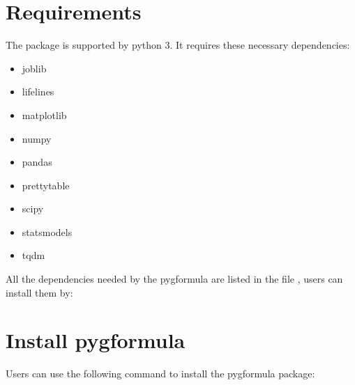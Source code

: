 \documentclass[letterpaper,10pt,english]{sphinxmanual}
\begin{document}
\section{Requirements}
\label{\detokenize{Installation:requirements}}
\sphinxAtStartPar
The package is supported by python 3. It requires these necessary dependencies:
\begin{itemize}
\item {} 
\sphinxAtStartPar
joblib

\item {} 
\sphinxAtStartPar
lifelines

\item {} 
\sphinxAtStartPar
matplotlib

\item {} 
\sphinxAtStartPar
numpy

\item {} 
\sphinxAtStartPar
pandas

\item {} 
\sphinxAtStartPar
prettytable

\item {} 
\sphinxAtStartPar
scipy

\item {} 
\sphinxAtStartPar
statsmodels

\item {} 
\sphinxAtStartPar
tqdm

\end{itemize}

\sphinxAtStartPar
All the dependencies needed by the pygformula are listed in the file
 , users can
install them by:

\begin{sphinxVerbatim}[commandchars=\\\{\}]
   
\end{sphinxVerbatim}


\section{Install pygformula}
\label{\detokenize{Installation:install-pygformula}}
\sphinxAtStartPar
Users can use the following command to install the pygformula package:

\begin{sphinxVerbatim}[commandchars=\\\{\}]
  
\end{sphinxVerbatim}
\end{document}

